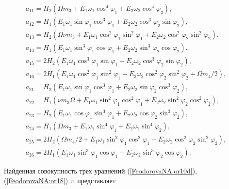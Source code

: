\begin{eqnarray*}

a_{11}=H_2(\Omega

m_3+E_1\omega_1\cos^4\varphi_1+E_2\omega_2\cos^4\varphi_2),\\

a_{12}=H_1(E_1\omega_1\sin\varphi_1\cos^3\varphi_1+E_2\omega_2\cos^3\varphi_2\sin\varphi_2),\\

a_{13}=H_2(\Omega\nu

m_3+E_1\omega_1\cos^2\varphi_1\sin^2\varphi_1+E_2\omega_2\cos^2\varphi_2\sin^2\varphi_2),\\

a_{14}=H_1(E_1\omega_1\sin^3\varphi_1\cos\varphi_1+E_2\omega_2\sin^3\varphi_2\cos\varphi_2),\\

a_{15}=2H_2(E_1\omega_1\cos^3\varphi_1\sin\varphi_1+E_2\omega_2\cos^3\varphi_2\sin\varphi_2),\\

a_{16}=2H_1(E_1\omega_1\cos^2\varphi_1\sin^2\varphi_1+E_2\omega_2\cos^2\varphi_2\sin^2\varphi_2+\Omega

m_4/2),\\

a_{21}=H_2(E_1\omega_1\sin\varphi_1\cos^3\varphi_1+E_2\omega_2\sin\varphi_2\cos^3\varphi_2),\\

a_{22}=H_1(\nu

m_3\Omega+E_1\omega_1\sin^2\varphi_1\cos^2\varphi_1+E_2\omega_2\sin^2\varphi_2\cos^2\varphi_2),\\

a_{23}=H_2(E_1\omega_1\cos\varphi_1\sin^3\varphi_1+E_2\omega_2\cos\varphi_2\sin^3\varphi_2),\\

a_{24}=H_1(\Omega

m_3+E_1\omega_1\sin^4\varphi_1+E_2\omega_2\sin^4\varphi_2),\\

a_{25}=2H_2(\Omega

m_4/2+E_1\omega_1\sin^2\varphi_1\cos^2\varphi_1+E_2\omega_2\cos^2\varphi_2\sin^2\varphi_2),\\

a_{26}=2H_1(E_1\omega_1\sin^3\varphi_1\cos\varphi_1+E_2\omega_2\sin^3\varphi_2\cos\varphi_2).

\end{eqnarray*}



Найденная совокупность трех уравнений (\ref{FeodorovaNA:or10d}), (\ref{FeodorovaNA:or18}) и~представляет

